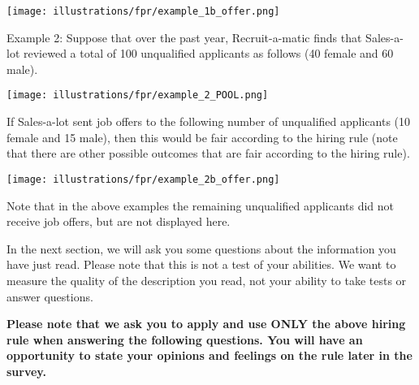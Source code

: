 \documentclass{article}
\begin{document}
\texttt{[image: illustrations/fpr/example\_1b\_offer.png]}

Example 2: Suppose that over the past year, Recruit-a-matic finds that Sales-a-lot reviewed a total of 100 unqualified applicants as follows (40 female and 60 male).

\texttt{[image: illustrations/fpr/example\_2\_POOL.png]}

If Sales-a-lot sent job offers to the following number of unqualified applicants (10 female and 15 male), then this would be fair according to the hiring rule (note that there are other possible outcomes that are fair according to the hiring rule).

\texttt{[image: illustrations/fpr/example\_2b\_offer.png]}

Note that in the above examples the remaining unqualified applicants did not receive job offers, but are not displayed here.

In the next section, we will ask you some questions about the information you have just read. Please note that this is not a test of your abilities. We want to measure the quality of the description you read, not your ability to take tests or answer questions.

\textbf{Please note that we ask you to apply and use ONLY the above hiring rule when answering the following questions. You will have an opportunity to state your opinions and feelings on the rule later in the survey.}
\end{document}
